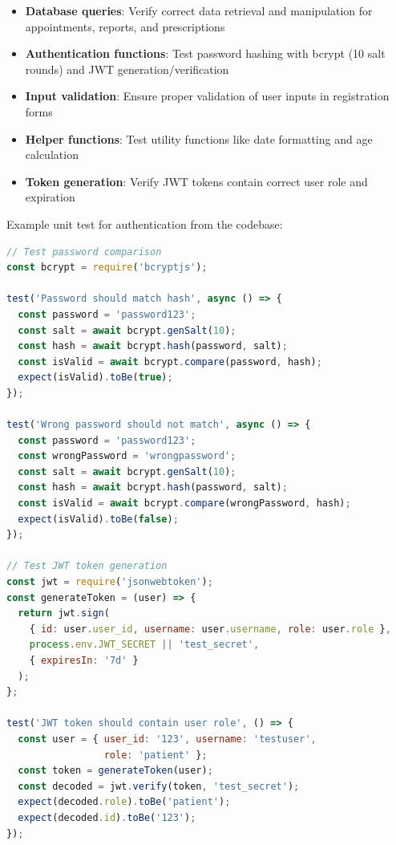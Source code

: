 \begin{itemize}
    \item \textbf{Database queries}: Verify correct data retrieval and manipulation for appointments, reports, and prescriptions
    \item \textbf{Authentication functions}: Test password hashing with bcrypt (10 salt rounds) and JWT generation/verification
    \item \textbf{Input validation}: Ensure proper validation of user inputs in registration forms
    \item \textbf{Helper functions}: Test utility functions like date formatting and age calculation
    \item \textbf{Token generation}: Verify JWT tokens contain correct user role and expiration
\end{itemize}

Example unit test for authentication from the codebase:

\begin{lstlisting}[language=JavaScript, caption=Unit Test Example, basicstyle=\ttfamily\scriptsize, breaklines=true]
// Test password comparison
const bcrypt = require('bcryptjs');

test('Password should match hash', async () => {
  const password = 'password123';
  const salt = await bcrypt.genSalt(10);
  const hash = await bcrypt.hash(password, salt);
  const isValid = await bcrypt.compare(password, hash);
  expect(isValid).toBe(true);
});

test('Wrong password should not match', async () => {
  const password = 'password123';
  const wrongPassword = 'wrongpassword';
  const salt = await bcrypt.genSalt(10);
  const hash = await bcrypt.hash(password, salt);
  const isValid = await bcrypt.compare(wrongPassword, hash);
  expect(isValid).toBe(false);
});

// Test JWT token generation
const jwt = require('jsonwebtoken');
const generateToken = (user) => {
  return jwt.sign(
    { id: user.user_id, username: user.username, role: user.role },
    process.env.JWT_SECRET || 'test_secret',
    { expiresIn: '7d' }
  );
};

test('JWT token should contain user role', () => {
  const user = { user_id: '123', username: 'testuser', 
                 role: 'patient' };
  const token = generateToken(user);
  const decoded = jwt.verify(token, 'test_secret');
  expect(decoded.role).toBe('patient');
  expect(decoded.id).toBe('123');
});
\end{lstlisting}

